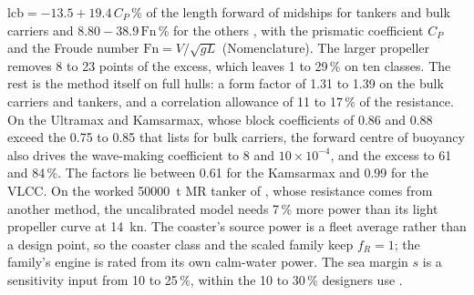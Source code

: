 $\mathrm{lcb}=-13.5+19.4\,C_P$\,\% of the length forward of midships for tankers and bulk carriers and $8.80-38.9\,\mathrm{Fn}$\,\% for the others \citep{ventura_estimation}, with the prismatic coefficient $C_P$ and the Froude number $\mathrm{Fn}=V/\sqrt{gL}$ (Nomenclature). The larger propeller removes 8 to 23 points of the excess, which leaves 1 to 29\,\% on ten classes. The rest is the method itself on full hulls: a form factor of 1.31 to 1.39 on the bulk carriers and tankers, and a correlation allowance of 11 to 17\,\% of the resistance. On the Ultramax and Kamsarmax, whose block coefficients of 0.86 and 0.88 exceed the 0.75 to 0.85 that \citet{man2011} lists for bulk carriers, the forward centre of buoyancy also drives the wave-making coefficient to 8 and $10\times10^{-4}$, and the excess to 61 and 84\,\%. The factors lie between 0.61 for the Kamsarmax and 0.99 for the VLCC. On the worked \num{50000}~t MR tanker of \citet{man2011}, whose resistance comes from another method, the uncalibrated model needs 7\,\% more power than its light propeller curve at \SI{14}{kn}. The coaster's source power is a fleet average rather than a design point, so the coaster class and the scaled family keep $f_R=1$; the family's engine is rated from its own calm-water power. The sea margin $s$ is a sensitivity input from 10 to 25\,\%, within the 10 to 30\,\% designers use \citep{man2011}.

